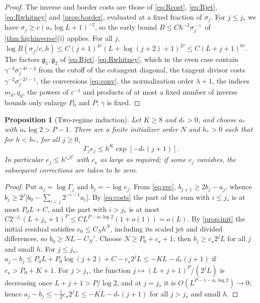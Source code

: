 \documentclass[11pt]{amsart}
\numberwithin{equation}{section}
\newtheorem{proposition}[theorem]{Proposition}
\theoremstyle{definition}
\theoremstyle{remark}
\newcommand{\eps}{\varepsilon}
\begin{document}
\begin{proof}
The inverse and border costs are those of \eqref{eq:Rcost}, \eqref{eq:Rjet}, \eqref{eq:Rwhitney} and \cref{prop:border}, evaluated at a fixed fraction of $\sigma_j$. For $j\le j_*$ we have $\sigma_j\ge c(a_*\log L+1)^{-2}$, so the early bound $B\le Ch^{-2}\sigma_j^{-\varsigma}$ of \cref{thm:highinverse}(i) applies. For all $j$, $\log B(\sigma_j/c,h)\le C(j+1)^{4\tau}(L+\log(j+2)+1)^{2\tau}\le C(L+j+1)^{6\tau}$. The factors $\mathfrak g_1,\mathfrak g_2$ of \eqref{eq:Rjet}--\eqref{eq:Rwhitney}, which in the even case contain $\gamma^{-4}\sigma_j^{-4\tau-4}$ from the cutoff of the cotangent diagonal, the tangent divisor costs $\gamma^{-2}\sigma_j^{-2\tau-1}$, the conversions \eqref{eq:conv}, the normalization order $\lambda+1$, the indices $m_d,q_d$, the powers of $\eps^{-1}$ and products of at most a fixed number of inverse bounds only enlarge $P_0$ and $P$; $\gamma$ is fixed.
\end{proof}

\begin{proposition}[Two-regime induction]\label{prop:induction}
Let $K\ge8$ and $d_*>0$, and choose $a_*$ with $a_*\log2>P-1$. There are a finite initializer order $N$ and $h_*>0$ such that for $h<h_*$, for all $j\ge0$,
\begin{equation}\label{eq:target}
\Gamma_je_j\le h^K\exp[-d_*(j+1)] .
\end{equation}
In particular $e_j\le h^{c_\star2^j}$ with $c_\star$ as large as required; if some $e_j$ vanishes, the subsequent corrections are taken to be zero.
\end{proposition}

\begin{proof}
Put $a_j=\log\Gamma_j$ and $b_j=-\log e_j$. From \eqref{eq:rec}, $b_{j+1}\ge2b_j-a_j$, whence $b_j\ge2^j\bigl[b_0-\sum_{i<j}2^{-i-1}a_i\bigr]$. By \eqref{eq:costs} the part of the sum with $i\le j_*$ is at most $P_0L+C$, and the part with $i>j_*$ is at most $C2^{-j_*}(L+j_*+1)^P\le CL^{P-a_*\log2}(1+o(1))=o(L)$. By \cref{prop:init} the initial residual satisfies $e_0\le C_Nh^N$, including its scaled jet and divided differences, so $b_0\ge NL-C_N'$. Choose $N\ge P_0+c_\star+1$; then $b_j\ge c_\star2^jL$ for all $j$ and small $h$. For $j\le j_*$, $a_j-b_j\le P_0L+P_0\log(j+2)+C-c_\star2^jL\le-KL-d_*(j+1)$ if $c_\star>P_0+K+1$. For $j>j_*$, the function $j\mapsto(L+j+1)^P/(2^jL)$ is decreasing once $L+j+1>P/\log2$, and at $j=j_*$ it is $O(L^{P-1-a_*\log2})\to0$; hence $a_j-b_j\le-\frac12c_\star2^jL\le-KL-d_*(j+1)$ for all $j>j_*$ and small $h$.
\end{proof}
\end{document}
